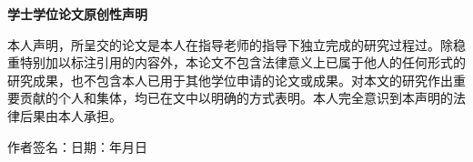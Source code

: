 %
%
%
%
%
%


\pagestyle{originality}
\topskip=0pt

\newcommand{\circled}[2][]{\tikz[baseline=(char.base)]
  {\node[shape = circle, draw, inner sep = 1pt]
  (char) {\phantom{\ifblank{#1}{#2}{#1}}};
  \node at (char.center) {\makebox[0pt][c]{#2}};}}
\robustify{\circled}

\setlength{\parskip}{0.4em}
\renewcommand{\baselinestretch}{1.41}

\vspace*{-6mm}

\begin{center}
  \heiti{}\textbf{学士学位论文原创性声明}
\end{center}


本人声明，所呈交的论文是本人在指导老师的指导下独立完成的研究过程过。除稳重特别加以标注引用的内容外，本论文不包含法律意义上已属于他人的任何形式的研究成果，也不包含本人已用于其他学位申请的论文或成果。对本文的研究作出重要贡献的个人和集体，均已在文中以明确的方式表明。本人完全意识到本声明的法律后果由本人承担。

\vspace{13mm}

\begin{flushright}
  作者签名：\hspace{40mm}日\hspace{2.5mm}期：\hspace{13mm}年\hspace{8mm}月\hspace{8mm}日
\end{flushright}

